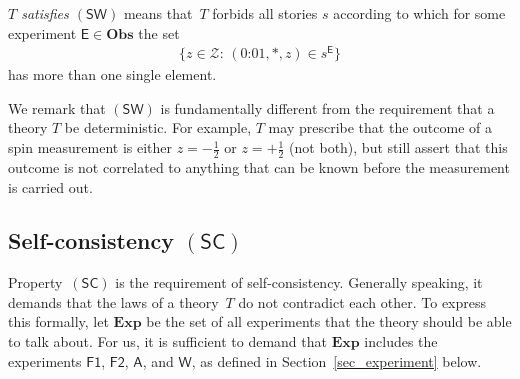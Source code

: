 \documentclass{article}
\theoremstyle{plain}
\theoremstyle{definition}
\newcommand*{\cZ}{\mathcal{Z}}
\newcommand*{\RR}[1]{\textcolor{orange}{{[#1]}} }
\newcommand*{\Exp}{\mathsf{E}}
\newcommand*{\Friendone}{\mathsf{F1}}
\newcommand*{\Friendtwo}{\mathsf{F2}}
\newcommand*{\Assistant}{\mathsf{A}}
\newcommand*{\Wigner}{\mathsf{W}}
\newcommand*{\BOE}{\mathbf{Obs}}
\newcommand*{\allExp}{\mathbf{Exp}}
\newcommand*{\sminus}{{\textstyle - \frac{1}{2}}}
\newcommand*{\splus}{{\textstyle + \frac{1}{2}}}
\newcommand*{\SW}{\mathsf{(SW)}}
\newcommand*{\SelfCons}{\mathsf{(SC)}}
\begin{document}
\begin{shaded}
  \noindent  \emph{$T$ satisfies $\SW$} means that~$T$ forbids all stories $s$ according to which for some experiment $\Exp \in \BOE$ the set
  \begin{align*}
    \bigl\{ z \in \cZ: \,  (\text{0:01}, *, z) \in s^{\Exp}\bigr\}
   \end{align*}    
   has more than one single element.
\end{shaded}



We remark that $\SW$ is fundamentally different from the requirement that a theory $T$ be deterministic. For example, $T$ may prescribe that the outcome of a spin measurement is either $z = \sminus$ or $z = \splus$ (not both), but still assert that this outcome is not correlated to anything that can be known before the measurement is carried out. 


\subsection{Self-consistency $\SelfCons$}

Property~$\SelfCons$ is the requirement of self-consistency. Generally speaking, it demands that the laws of a theory~$T$ do not contradict each other. To express this formally,  let $\allExp$ be the set of all experiments that the theory should be able to talk about. For us, it is sufficient to demand that $\allExp$ includes the experiments $\Friendone$, $\Friendtwo$, $\Assistant$, and $\Wigner$, as defined in Section~\ref{sec_experiment} below. 




%
\end{document}
